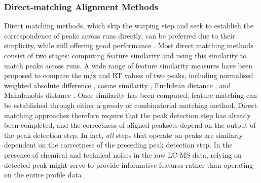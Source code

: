 \subsubsection{Direct-matching Alignment Methods}

Direct matching methods, which skip the warping step and seek to establish the correspondence of peaks across runs directly, can be preferred due to their simplicity, while still offering good performance \cite{Lange2008}. Most direct matching methods consist of two stages: computing feature similarity and using this similarity to match peaks across runs. A wide range of feature similarity measures have been proposed to compare the m/z and RT values of two peaks, including normalised weighted absolute difference \cite{Pluskal2010}, cosine similarity \cite{Hoffmann2012a}, Euclidean distance \cite{Ballardini2011}, and Mahalanobis distance \cite{Voss2011a}. Once similarity has been computed, feature matching can be established through either a greedy or combinatorial matching method. Direct matching approaches therefore require that the peak detection step has already been completed, and the correctness of aligned peaksets depend on the output of the peak detection step. In fact, \emph{all} steps that operate on peaks are similarly dependent on the correctness of the preceding peak detection step. In the presence of chemical and technical noises in the raw LC-MS data, relying on detected peak might serve to provide informative features rather than operating on the entire profile data \cite{Smith2014}.



